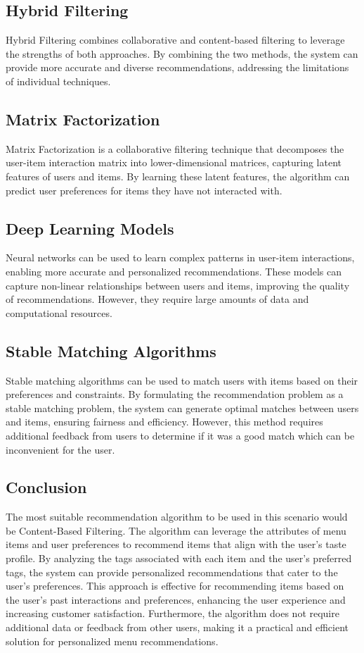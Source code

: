 \subsection*{Hybrid Filtering}
Hybrid Filtering combines collaborative and content-based filtering to leverage the strengths of both approaches. By combining the two methods, the system can provide more accurate and diverse recommendations, addressing the limitations of individual techniques.

\subsection*{Matrix Factorization}
Matrix Factorization is a collaborative filtering technique that decomposes the user-item interaction matrix into lower-dimensional matrices, capturing latent features of users and items. By learning these latent features, the algorithm can predict user preferences for items they have not interacted with.

\subsection*{Deep Learning Models}
Neural networks can be used to learn complex patterns in user-item interactions, enabling more accurate and personalized recommendations. These models can capture non-linear relationships between users and items, improving the quality of recommendations. However, they require large amounts of data and computational resources.

\subsection*{Stable Matching Algorithms}
Stable matching algorithms can be used to match users with items based on their preferences and constraints. By formulating the recommendation problem as a stable matching problem, the system can generate optimal matches between users and items, ensuring fairness and efficiency. However, this method requires additional feedback from users to determine if it was a good match which can be inconvenient for the user.

\subsection*{Conclusion}
The most suitable recommendation algorithm to be used in this scenario would be Content-Based Filtering. The algorithm can leverage the attributes of menu items and user preferences to recommend items that align with the user's taste profile. By analyzing the tags associated with each item and the user's preferred tags, the system can provide personalized recommendations that cater to the user's preferences. This approach is effective for recommending items based on the user's past interactions and preferences, enhancing the user experience and increasing customer satisfaction. Furthermore, the algorithm does not require additional data or feedback from other users, making it a practical and efficient solution for personalized menu recommendations.


